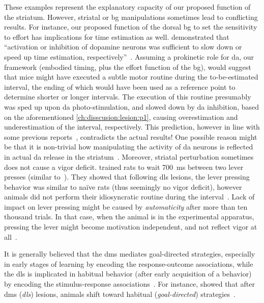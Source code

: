 These examples represent the explanatory capacity of our proposed function of the striatum.
However, striatal or \gls{bg} manipulations sometimes lead to conflicting results.
For instance, our proposed function of the dorsal \gls{bg} to set the sensitivity to effort has implications for time estimation as well.
 demonstrated that ``activation or inhibition of dopamine neurons was sufficient to slow down or speed up time estimation, respectively''~\cite{Paton2016Sci}.
Assuming a prokinetic role for \gls{da}, our framework (embodied timing, plus the effort function of the \gls{bg}), would suggest that mice might have executed a subtle motor routine during the to-be-estimated interval, the ending of which would have been used as a reference point to determine shorter or longer intervals.
The execution of this routine presumably was sped up upon \gls{da} photo-stimulation, and slowed down by \gls{da} inhibition, based on the aforementioned \autoref{ch:disscusion:lesion:p1}, causing overestimation and underestimation of the interval, respectively.
This prediction, however in line with some previous reports~\cite[see][for a review]{Buhusi2005NatRevNeuro}, contradicts the actual results!
One possible reason might be that it is non-trivial how manipulating the activity of \gls{da} neurons is reflected in actual \gls{da} release in the striatum~\cite[for instance, see][]{Mohebi2019N}.
Moreover, striatal perturbation sometimes does not cause a vigor deficit.
 trained rats to wait 700~ms between two lever presses (similar to~\cite{Kawai2015}).
They showed that following \gls{dls} lesions, the lever pressing behavior was similar to na\"{i}ve rats (thus seemingly no vigor deficit), however animals did not perform their idiosyncratic routine during the interval~\cite{Dhawale2019}.
Lack of impact on lever pressing might be caused by \emph{automaticity}\! after more than ten thousand trials.
In that case, when the animal is in the experimental apparatus, pressing the lever might become motivation independent, and not reflect vigor at all~\cite{Dudman2016CurrOpinNeurobiol}.
\par
It is generally believed that the \gls{dms} mediates goal-directed strategies, especially in early stages of learning by encoding the response-outcome associations, while the \gls{dls} is implicated in habitual behavior (after early acquisition of a behavior) by encoding the stimulus-response associations~\cite{Yin2006NatRevNeurosci}.
For instance,  showed that after \gls{dms} (\textit{\gls{dls}}) lesions, animals shift toward habitual (\textit{goal-directed}) strategies~\cite{Gremel2013}.

